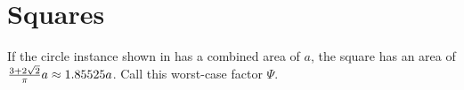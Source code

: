 \documentclass[%
    a4paper,              %
    style=screen,          %
    bibliography=totoc,   %
    nexus,                %
    lnum,                 %
    extramargin,          %
]{tubsbook}
\begin{document}
%
%
%
%
%
%
%
%

%
%

\chapter{Squares}

\begin{lemma}
    If the circle instance shown in  has a combined area of $a$, the square has an area of $\frac{3+2\sqrt{2}}{\pi}a \approx 1.85525a$. Call this worst-case factor $\Psi$.
\end{lemma}
\end{document}
